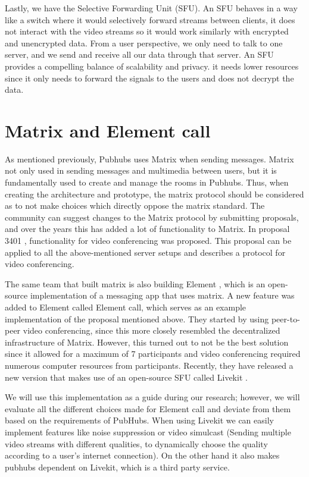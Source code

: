 \documentclass{report}
\begin{document}
    Lastly, we have the Selective Forwarding Unit (SFU). An SFU behaves in a way like a switch where it would
    selectively forward streams between clients, it does not interact with the video streams so it would work similarly
    with encrypted and unencrypted data. From a user perspective, we only need to talk to one server, and we send and
    receive all our data through that server. An SFU provides a compelling balance of scalability and privacy. it needs
    lower resources since it only needs to forward the signals to the users and does not decrypt the data.


    \section{Matrix and Element call}
    As mentioned previously, Pubhubs uses Matrix when sending messages. Matrix not only used in sending messages and
    multimedia between users, but it is fundamentally used to create and manage the rooms in Pubhubs. Thus, when
    creating the architecture and prototype, the matrix protocol should be considered as to not make choices which
    directly oppose the matrix standard. The community can suggest changes to the Matrix protocol by submitting
    proposals, and over the years this has added a lot of functionality to Matrix. In proposal 3401
    \cite{MATRIX_VIDEO_CALL_PROP}
    , functionality for video conferencing was proposed. This proposal can be applied to all the above-mentioned server
    setups and describes a protocol for video conferencing.

    The same team that built matrix is also building Element \cite{ELEMENT}
    , which is an open-source implementation of a messaging app that uses matrix. A new feature was added to Element
    called Element call, which serves as an example implementation of the proposal mentioned above. They started by
    using peer-to-peer video conferencing, since this more closely resembled the decentralized infrastructure of Matrix.
    However, this turned out to not be the best solution since it allowed for a maximum of 7 participants and video
    conferencing required numerous computer resources from participants. Recently, they have released a new version that
    makes use of an open-source SFU called Livekit \cite{LIVEKIT}.

    We will use this implementation as a guide during our research; however, we will evaluate all the different choices
    made for Element call and deviate from them based on the requirements of PubHubs. When using Livekit we can easily
    implement features like noise suppression or video simulcast (Sending multiple video streams with different
    qualities, to dynamically choose the quality according to a user's internet connection). On the other hand it
    also makes pubhubs dependent on Livekit, which is a third party service.
\end{document}

